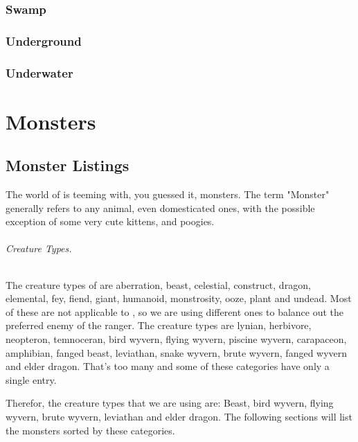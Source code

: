 \section{Swamp}
\lipsum[1]

\section{Underground}
\lipsum[1]

\section{Underwater}
\lipsum[1]



\renewcommand*{\hbPartCover}{assets/ext/lagiacrus}
\renewcommand*{\hbPartSubcover}{assets/ext/lagiacrus2}
\part{Monsters}

\chapter{Monster Listings}


The world of \MH{} is teeming with, you guessed it, monsters. The term "Monster" generally refers to any animal, even domesticated ones, with the possible exception of some very cute kittens, and poogies.

\paragraph{Creature Types.} The creature types of \DND{} are aberration, beast, celestial, construct, dragon, elemental, fey, fiend, giant, humanoid, monstrosity, ooze, plant and undead. Most of these are not applicable to \MH{}, so we are using different ones to balance out the preferred enemy of the ranger. The \MH{} creature types are lynian, herbivore, neopteron, temnoceran, bird wyvern, flying wyvern, piscine wyvern, carapaceon, amphibian, fanged beast, leviathan, snake wyvern, brute wyvern, fanged wyvern and elder dragon. That's too many and some of these categories have only a single entry.

Therefor, the creature types that we are using are: Beast, bird wyvern, flying wyvern, brute wyvern, leviathan and elder dragon. The following sections will list the monsters sorted by these categories.

